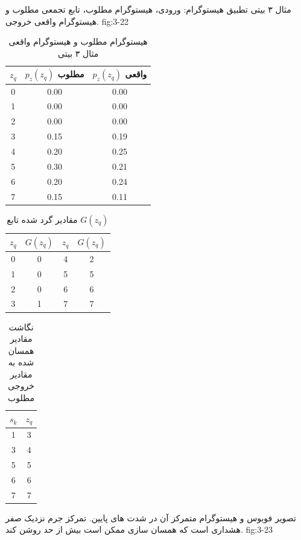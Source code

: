 {مثال ۳ بیتی تطبیق هیستوگرام: ورودی، هیستوگرام مطلوب، تابع تجمعی مطلوب و
هیستوگرام واقعی خروجی.}
{fig:3-22}

\begin{table}[H]
\centering
\caption{هیستوگرام مطلوب و هیستوگرام واقعی مثال ۳ بیتی}
\label{tab:3-2}
\begin{tabular}{ccc}
\toprule
\(z_q\) & \(p_z(z_q)\) مطلوب & \(p_z(z_q)\) واقعی\\
\midrule
0 & 0.00 & 0.00\\
1 & 0.00 & 0.00\\
2 & 0.00 & 0.00\\
3 & 0.15 & 0.19\\
4 & 0.20 & 0.25\\
5 & 0.30 & 0.21\\
6 & 0.20 & 0.24\\
7 & 0.15 & 0.11\\
\bottomrule
\end{tabular}
\end{table}

\begin{table}[H]
\centering
\caption{مقادیر گرد شده تابع \(G(z_q)\)}
\label{tab:3-3}
\begin{tabular}{cc@{\qquad}cc}
\toprule
\(z_q\) & \(G(z_q)\) & \(z_q\) & \(G(z_q)\)\\
\midrule
0 & 0 & 4 & 2\\
1 & 0 & 5 & 5\\
2 & 0 & 6 & 6\\
3 & 1 & 7 & 7\\
\bottomrule
\end{tabular}
\end{table}

\begin{table}[H]
\centering
\caption{نگاشت مقادیر همسان شده به مقادیر خروجی مطلوب}
\label{tab:3-4}
\begin{tabular}{cc}
\toprule
\(s_k\) & \(z_q\)\\
\midrule
1 & 3\\
3 & 4\\
5 & 5\\
6 & 6\\
7 & 7\\
\bottomrule
\end{tabular}
\end{table}

{تصویر فوبوس و هیستوگرام متمرکز آن در شدت های پایین. تمرکز جرم نزدیک صفر
هشداری است که همسان سازی ممکن است بیش از حد روشن کند.}
{fig:3-23}

